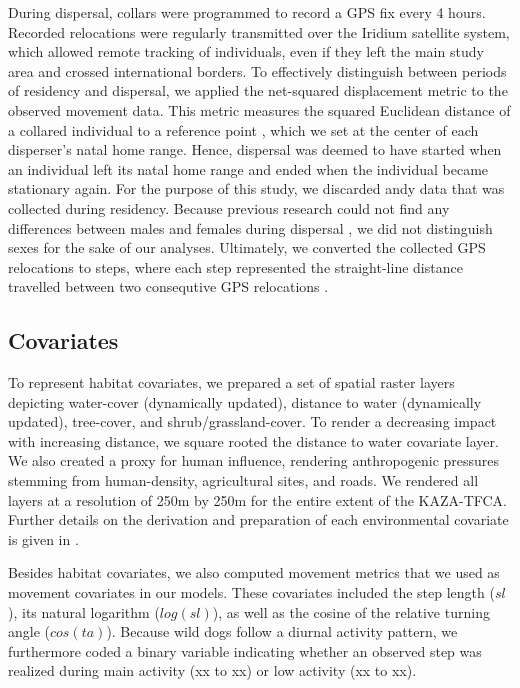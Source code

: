\documentclass[abstract=on,10pt,a4paper,bibliography=totocnumbered]{article}
\begin{document}
During dispersal, collars were programmed to record a GPS fix every 4 hours.
Recorded relocations were regularly transmitted over the Iridium satellite
system, which allowed remote tracking of individuals, even if they left the main
study area and crossed international borders. To effectively distinguish between
periods of residency and dispersal, we applied the net-squared displacement
metric to the observed movement data. This metric measures the squared Euclidean
distance of a collared individual to a reference point \citep{Borger.2012},
which we set at the center of each disperser's natal home range. Hence,
dispersal was deemed to have started when an individual left its natal home
range and ended when the individual became stationary again. For the purpose of
this study, we discarded andy data that was collected during residency. Because
previous research could not find any differences between males and females
during dispersal \citep{Woodroffe.2019, Cozzi.2020}, we did not distinguish
sexes for the sake of our analyses. Ultimately, we converted the collected GPS
relocations to steps, where each step represented the straight-line distance
travelled between two consequtive GPS relocations \citep{Turchin.1998}.

\subsection{Covariates}
To represent habitat covariates, we prepared a set of spatial raster layers
depicting water-cover (dynamically updated), distance to water (dynamically
updated), tree-cover, and shrub/grassland-cover. To render a decreasing impact
with increasing distance, we square rooted the distance to water covariate
layer. We also created a proxy for human influence, rendering anthropogenic
pressures stemming from human-density, agricultural sites, and roads. We
rendered all layers at a resolution of 250m by 250m for the entire extent of the
KAZA-TFCA. Further details on the derivation and preparation of each
environmental covariate is given in \cite{Hofmann.2020}.

Besides habitat covariates, we also computed movement metrics that we used as
movement covariates in our models. These covariates included the step length
(\(sl\)), its natural logarithm (\(log(sl)\)), as well as the cosine of the
relative turning angle (\(cos(ta)\)). Because wild dogs follow a diurnal
activity pattern, we furthermore coded a binary variable indicating whether an
observed step was realized during main activity (xx to xx) or low activity (xx
to xx).
\end{document}
